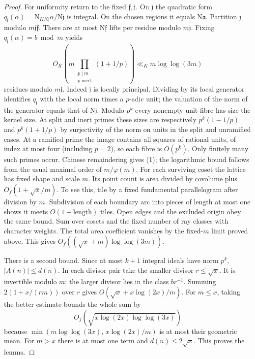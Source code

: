 \documentclass[11pt,a4paper]{article}
\newcommand{\N}{\mathrm N}
\newcommand{\Q}{\mathbb Q}
\begin{document}
\begin{proof}
For uniformity return to the fixed $\mathfrak f,\mathfrak j$. On $\mathfrak j$ the quadratic form $q_{\mathfrak j}(\alpha)=\N_{K/\Q}\alpha/\N\mathfrak j$ is integral. On the chosen regions it equals $\N\mathfrak a$. Partition $\mathfrak j$ modulo $m\mathfrak j\mathfrak f$. There are at most $\N\mathfrak f$ lifts per residue modulo $m\mathfrak j$. Fixing $q_{\mathfrak j}(\alpha)=b\bmod m$ yields
\[
 O_K\!\left(m\prod_{\substack{p\mid m\\p\text{ inert}}}(1+1/p)\right)
 \ll_K m\log\log(3m)
 \tag{1}
\]
residues modulo $m\mathfrak j$. Indeed $\mathfrak j$ is locally principal. Dividing by its local generator identifies $q_{\mathfrak j}$ with the local norm times a $p$-adic unit; the valuation of the norm of the generator equals that of $\N\mathfrak j$. Modulo $p^k$ every nonempty unit fibre has size the kernel size. At split and inert primes these sizes are respectively $p^k(1-1/p)$ and $p^k(1+1/p)$ by surjectivity of the norm on units in the split and unramified cases. At a ramified prime the image contains all squares of rational units, of index at most four (including $p=2$), so each fibre is $O(p^k)$. Only finitely many such primes occur. Chinese remaindering gives (1); the logarithmic bound follows from the usual maximal order of $m/\varphi(m)$.
\newpage
For each surviving coset the lattice has fixed shape and scale $m$. Its point count is area divided by covolume plus $O_f(1+\sqrt x/m)$. To see this, tile by a fixed fundamental parallelogram after division by $m$. Subdivision of each boundary arc into pieces of length at most one shows it meets $O(1+\text{length})$ tiles. Open edges and the excluded origin obey the same bound. Sum over cosets and the fixed number of ray classes with character weights. The total area coefficient vanishes by the fixed-$m$ limit proved above. This gives $O_f((\sqrt x+m)\log\log(3m))$.

There is a second bound. Since at most $k+1$ integral ideals have norm $p^k$, $|A(n)|\le d(n)$. In each divisor pair take the smaller divisor $r\le\sqrt x$. It is invertible modulo $m$; the larger divisor lies in the class $br^{-1}$. Summing $2(1+x/(rm))$ over $r$ gives $O(\sqrt x+x\log(2x)/m)$. For $m\le x$, taking the better estimate bounds the whole sum by
\[
 O_f\!\left(\sqrt{x\log(2x)\log\log(3x)}\right)
\]
because $\min(m\log\log(3x),\,x\log(2x)/m)$ is at most their geometric mean. For $m>x$ there is at most one term and $d(n)\le2\sqrt x$. This proves the lemma.
\end{proof}
\end{document}

